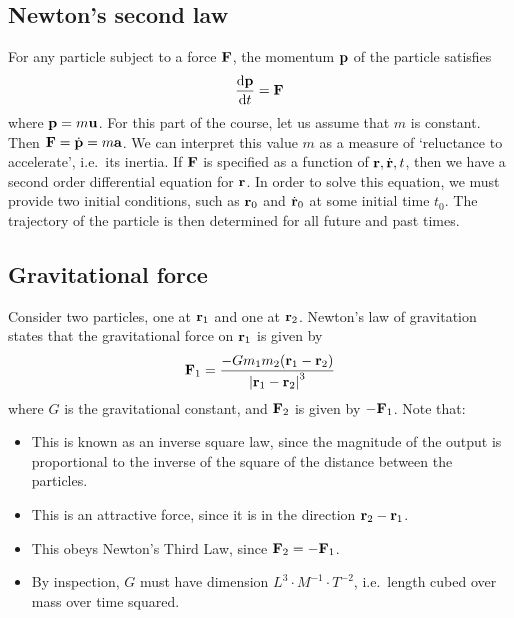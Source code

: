 \subsection{Newton's second law}
For any particle subject to a force \(\vb F\), the momentum \(\vb p\) of the particle satisfies
\[
	\frac{\dd \vb p}{\dd{t}} = \vb F
\]
where \(\vb p = m \vb u\).
For this part of the course, let us assume that \(m\) is constant.
Then \(\vb F = \dot{\vb p} = m \vb a\).
We can interpret this value \(m\) as a measure of `reluctance to accelerate', i.e.\ its inertia.
If \(\vb F\) is specified as a function of \(\vb r, \dot{\vb r}, t\), then we have a second order differential equation for \(\vb r\).
In order to solve this equation, we must provide two initial conditions, such as \(\vb r_0\) and \(\dot{\vb r}_0\) at some initial time \(t_0\).
The trajectory of the particle is then determined for all future and past times.

\subsection{Gravitational force}
Consider two particles, one at \(\vb r_1\) and one at \(\vb r_2\).
Newton's law of gravitation states that the gravitational force on \(\vb r_1\) is given by
\[
	\vb F_1 = \frac{- G m_1 m_2 (\vb r_1 - \vb r_2)}{\abs{\vb r_1 - \vb r_2}^3}
\]
where \(G\) is the gravitational constant, and \(\vb F_2\) is given by \(-\vb F_1\).
Note that:
\begin{itemize}
	\item This is known as an inverse square law, since the magnitude of the output is proportional to the inverse of the square of the distance between the particles.
	\item This is an attractive force, since it is in the direction \(\vb r_2 - \vb r_1\).
	\item This obeys Newton's Third Law, since \(\vb F_2 = - \vb F_1\).
	\item By inspection, \(G\) must have dimension \(L^3 \cdot M^{-1} \cdot T^{-2}\), i.e.\ length cubed over mass over time squared.
\end{itemize}

